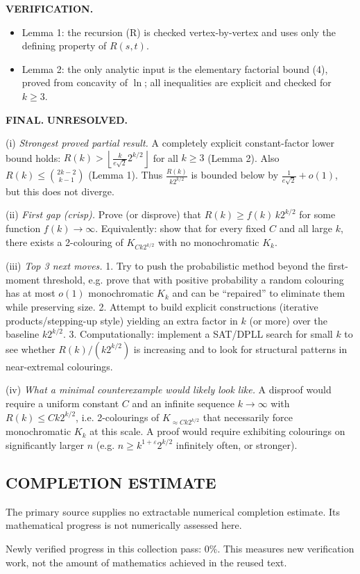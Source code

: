 \textbf{VERIFICATION.}
\begin{itemize}
\item Lemma 1: the recursion (R) is checked vertex-by-vertex and uses only the defining property of $R(s,t)$.
\item Lemma 2: the only analytic input is the elementary factorial bound (4), proved from concavity of $\ln$; all inequalities are explicit and checked for $k\ge 3$.
\end{itemize}

\textbf{FINAL.} \textbf{UNRESOLVED.}

(i) \emph{Strongest proved partial result.} A completely explicit constant-factor lower bound holds:
$R(k) > \left\lfloor \frac{k}{e\sqrt{2}}2^{k/2}\right\rfloor$ for all $k\ge 3$ (Lemma 2). Also $R(k)\le \binom{2k-2}{k-1}$ (Lemma 1).
Thus $\frac{R(k)}{k2^{k/2}}$ is bounded below by $\frac{1}{e\sqrt{2}}+o(1)$, but this does not diverge.

(ii) \emph{First gap (crisp).} Prove (or disprove) that $R(k)\ge f(k)\,k2^{k/2}$ for some function $f(k)\to\infty$.
Equivalently: show that for every fixed $C$ and all large $k$, there exists a 2-colouring of $K_{Ck2^{k/2}}$ with no monochromatic $K_k$.

(iii) \emph{Top 3 next moves.}
1. Try to push the probabilistic method beyond the first-moment threshold, e.g. prove that with positive probability a random colouring has at most $o(1)$ monochromatic $K_k$ and can be ``repaired'' to eliminate them while preserving size.
2. Attempt to build explicit constructions (iterative products/stepping-up style) yielding an extra factor in $k$ (or more) over the baseline $k2^{k/2}$.
3. Computationally: implement a SAT/DPLL search for small $k$ to see whether $R(k)/(k2^{k/2})$ is increasing and to look for structural patterns in near-extremal colourings.

(iv) \emph{What a minimal counterexample would likely look like.} A disproof would require a uniform constant $C$ and an infinite sequence $k\to\infty$ with $R(k)\le Ck2^{k/2}$, i.e. 2-colourings of $K_{\approx Ck2^{k/2}}$ that necessarily force monochromatic $K_k$ at this scale.
A proof would require exhibiting colourings on significantly larger $n$ (e.g. $n\ge k^{1+\varepsilon}2^{k/2}$ infinitely often, or stronger).




\subsection*{COMPLETION ESTIMATE}
The primary source supplies no extractable numerical completion estimate. Its mathematical progress is not numerically assessed here.

Newly verified progress in this collection pass: $0\%$. This measures new verification work, not the amount of mathematics achieved in the reused text.
